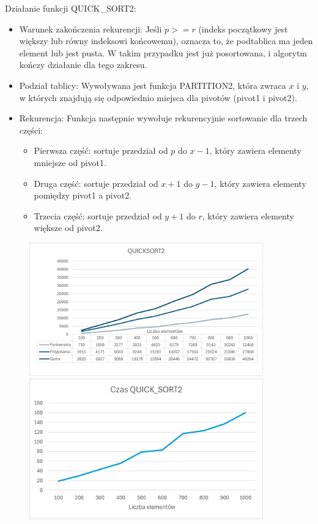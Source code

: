 \documentclass{article}
\begin{document}
		Działanie funkcji QUICK\_SORT2:
		\begin{itemize}
			\item Warunek zakończenia rekurencji:
			Jeśli $p >= r$ (indeks początkowy jest większy lub równy indeksowi końcowemu), oznacza to, że podtablica ma jeden element lub jest pusta. W takim przypadku jest już posortowana, i algorytm kończy działanie dla tego zakresu.
			
			\item Podział tablicy:
			Wywoływana jest funkcja PARTITION2, która zwraca \(x\) i \(y\), w których znajdują się odpowiednio miejsca dla pivotów (pivot1 i pivot2).
			
			\item Rekurencja:
			Funkcja następnie wywołuje rekurencyjnie sortowanie dla trzech części:
			
			\begin{itemize}
				\item Pierwsza część: sortuje przedział od \(p\) do \(x-1\), który zawiera elementy mniejsze od pivot1.
				\item Druga część: sortuje przedział od \(x+1\) do \(y-1\), który zawiera elementy pomiędzy pivot1 a pivot2.
				\item Trzecia część: sortuje przedział od \(y+1\) do \(r\), który zawiera elementy większe od pivot2.
			\end{itemize}	
		\end{itemize}	
		
		\begin{figure}[H]
			\centering
			\includegraphics[width=0.9\textwidth]{QS21.png}
			\includegraphics[width=0.9\textwidth]{QS22.png}
		\end{figure}
		
\end{document}
